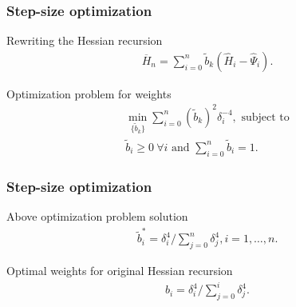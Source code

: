\begin{frame}
\begin{small}
\frametitle{\centering Step-size optimization}
\begin{block}{Rewriting the Hessian recursion}
\begin{align}
\label{eq:hess}
\overline H_n = \sum\limits_{i=0}^{n} \tilde b_k(\widehat H_i -\widehat \Psi_i).
\end{align}
\end{block}
\pause
\begin{block}{Optimization problem for weights}
\begin{align}
\min_{ \{\tilde b_k\} } \sum \limits_{i=0}^{n} (\tilde b_k)^2 \delta_i^{-4}, \text{ subject to} \label{eq:wn-opt}\\
\tilde b_i \geq 0 ~\forall i \text{ and }\sum \limits_{i=0}^{n} \tilde b_i = 1.
\end{align}
\end{block}
\end{small}
\end{frame}

\begin{frame}
\begin{small}
\frametitle{\centering Step-size optimization}
\begin{block}{Above optimization problem solution}
\begin{align}
\tilde b_i^* = \delta_i^{4}/\sum \limits_{j=0}^{n} \delta_j^{4}, i=1,\ldots,n.
\end{align}
\end{block}
\pause
\begin{block}{Optimal weights for original Hessian recursion}
\begin{align}
\label{eq:wieghts}
b_i  = \delta_i^{4}/\sum\limits_{j=0}^{i} \delta_j^{4}.
\end{align}
\end{block}
\end{small}
\end{frame}


